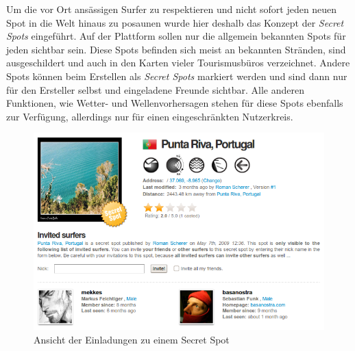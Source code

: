 Um die vor Ort ansässigen Surfer zu respektieren und nicht sofort
jeden neuen Spot in die Welt hinaus zu posaunen wurde hier deshalb das
Konzept der \textit{Secret Spots} eingeführt. Auf der Plattform sollen
nur die allgemein bekannten Spots für jeden sichtbar sein. Diese Spots
befinden sich meist an bekannten Stränden, sind ausgeschildert und
auch in den Karten vieler Tourismusbüros verzeichnet. Andere Spots
können beim Erstellen als \textit{Secret Spots} markiert werden und
sind dann nur für den Ersteller selbst und eingeladene Freunde
sichtbar. Alle anderen Funktionen, wie Wetter- und Wellenvorhersagen
stehen für diese Spots ebenfalls zur Verfügung, allerdings nur für
einen eingeschränkten Nutzerkreis.

\begin{figure}[t]
 \includegraphics[width=\textwidth]{bilder/secret-spot}
 \caption{Ansicht der Einladungen zu einem Secret Spot}
 \label{secret-spot}
\end{figure}

